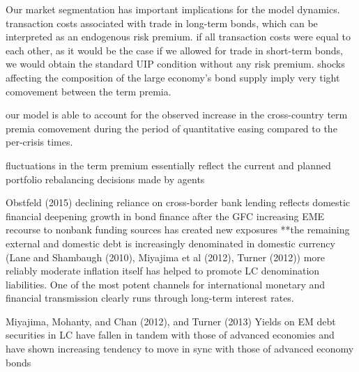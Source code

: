 Our market segmentation has important implications for the model dynamics.
transaction costs associated with trade in long-term bonds, which can be interpreted as an endogenous risk premium.
if all transaction costs were equal to each other, as it would be the case if we allowed for trade in short-term bonds, we would obtain the standard UIP condition without any risk premium.
shocks affecting the composition of the large economy's bond supply imply very tight comovement between the term premia.

our model is able to account for the observed increase in the cross-country term premia comovement during the period of quantitative easing compared to the per-crisis times.

fluctuations in the term premium essentially reflect the current and planned portfolio rebalancing decisions made by agents


Obstfeld (2015)
declining reliance on cross-border bank lending reflects domestic financial deepening
growth in bond finance after the GFC
increasing EME recourse to nonbank funding sources has created new exposures
**the remaining external and domestic debt is increasingly denominated in domestic currency (Lane and Shambaugh (2010), Miyajima et al (2012), Turner (2012))
more reliably moderate inflation itself has helped to promote LC denomination liabilities.
One of the most potent channels for international monetary and financial
transmission clearly runs through long-term interest rates.

Miyajima, Mohanty, and Chan (2012), and Turner (2013)
Yields on EM debt securities in LC have fallen in tandem with those of advanced economies and have shown increasing tendency to move in sync with those of advanced economy bonds

